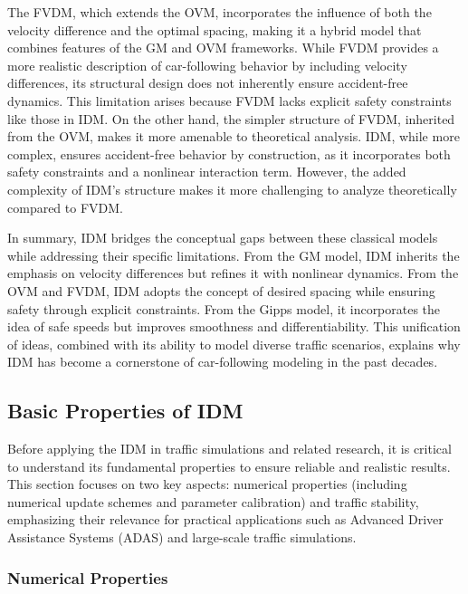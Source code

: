 \documentclass[a4paper,fleqn]{cas-sc}
\begin{document}
The FVDM, which extends the OVM, incorporates the influence of both the velocity difference and the optimal spacing, making it a hybrid model that combines features of the GM and OVM frameworks. While FVDM provides a more realistic description of car-following behavior by including velocity differences, its structural design does not inherently ensure accident-free dynamics. This limitation arises because FVDM lacks explicit safety constraints like those in IDM. On the other hand, the simpler structure of FVDM, inherited from the OVM, makes it more amenable to theoretical analysis. IDM, while more complex, ensures accident-free behavior by construction, as it incorporates both safety constraints and a nonlinear interaction term. However, the added complexity of IDM's structure makes it more challenging to analyze theoretically compared to FVDM.

In summary, IDM bridges the conceptual gaps between these classical models while addressing their specific limitations. From the GM model, IDM inherits the emphasis on velocity differences but refines it with nonlinear dynamics. From the OVM and FVDM, IDM adopts the concept of desired spacing while ensuring safety through explicit constraints. From the Gipps model, it incorporates the idea of safe speeds but improves smoothness and differentiability. This unification of ideas, combined with its ability to model diverse traffic scenarios, explains why IDM has become a cornerstone of car-following modeling in the past decades.

\subsection{Basic Properties of IDM}

Before applying the IDM in traffic simulations and related research, it is critical to understand its fundamental properties to ensure reliable and realistic results. This section focuses on two key aspects: numerical properties (including numerical update schemes and parameter calibration) and traffic stability, emphasizing their relevance for practical applications such as Advanced Driver Assistance Systems (ADAS) and large-scale traffic simulations.

\subsubsection{Numerical Properties}
\end{document}
